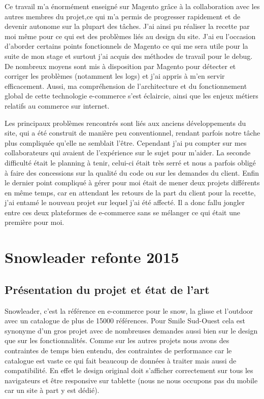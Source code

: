 \documentclass[a4paper,11pt,twoside]{report}
\begin{document}
    Ce travail m'a énormément enseigné sur Magento grâce à la collaboration avec les autres membres du projet,ce qui m'a permis de progresser rapidement et de devenir autonome sur la plupart des tâches. J'ai ainsi pu réaliser la recette par moi même pour ce qui est des problèmes liés au design du site. J'ai eu l'occasion d'aborder certains points fonctionnels de Magento ce qui me sera utile pour la suite de mon stage et surtout j'ai acquis des méthodes de travail pour le debug. De nombreux moyens sont mis à disposition par Magento pour détecter et corriger les problèmes (notamment les logs) et j'ai appris à m'en servir efficacement. Aussi, ma compréhension de l'architecture et du fonctionnement global de cette technologie e-commerce s'est éclaircie, ainsi que les enjeux métiers relatifs au commerce sur internet.
    
    Les principaux problèmes rencontrés sont liés aux anciens développements du site, qui a été construit de manière peu conventionnel, rendant parfois notre tâche plus compliquée qu'elle ne semblait l'être. Cependant j'ai pu compter sur mes collaborateurs qui avaient de l'expérience sur le sujet pour m'aider. La seconde difficulté était le planning à tenir, celui-ci était très serré et nous a parfois obligé à faire des concessions sur la qualité du code ou sur les demandes du client. Enfin le dernier point compliqué à gérer pour moi était de mener deux projets différents en même temps, car en attendant les retours de la part du client pour la recette, j'ai entamé le nouveau projet sur lequel j'ai été affecté. Il a donc fallu jongler entre ces deux plateformes de e-commerce sans se mélanger ce qui était une première pour moi.   
    
        \newpage
    
  \section{Snowleader refonte 2015}
    \subsection*{Présentation du projet et état de l'art}
    Snowleader, c'est la référence en e-commerce pour le snow, la glisse et l'outdoor avec un catalogue de plus de 15000 références. Pour Smile Sud-Ouest cela est synonyme d'un gros projet avec de nombreuses demandes aussi bien sur le design que sur les fonctionnalités. Comme sur les autres projets nous avons des contraintes de temps bien entendu, des contraintes de performance car le catalogue est vaste ce qui fait beaucoup de données à traiter mais aussi de compatibilité. En effet le design original doit s'afficher correctement sur tous les navigateurs et être responsive sur tablette (nous ne nous occupons pas du mobile car un site à part y est dédié). 
    
\end{document}

